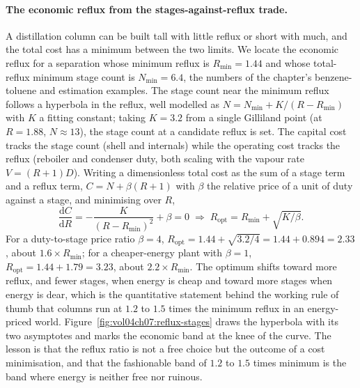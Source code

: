 \paragraph{The economic reflux from the stages-against-reflux trade.} A
distillation column can be built tall with little reflux or short with much,
and the total cost has a minimum between the two limits. We locate the
economic reflux for a separation whose minimum reflux is $R_{\min} = 1.44$
and whose total-reflux minimum stage count is $N_{\min} = 6.4$, the numbers of
the chapter's benzene-toluene and estimation examples. The stage count near
the minimum reflux follows a hyperbola in the reflux, well modelled as
$N = N_{\min} + K/(R - R_{\min})$ with $K$ a fitting constant; taking $K =
3.2$ from a single Gilliland point (at $R = 1.88$, $N \approx 13$), the stage
count at a candidate reflux is set. The capital cost tracks the stage count
(shell and internals) while the operating cost tracks the reflux (reboiler
and condenser duty, both scaling with the vapour rate $V = (R+1)D$). Writing
a dimensionless total cost as the sum of a stage term and a reflux term,
$C = N + \beta(R+1)$ with $\beta$ the relative price of a unit of duty
against a stage, and minimising over $R$,
\[
\frac{\mathrm{d}C}{\mathrm{d}R} = -\frac{K}{(R - R_{\min})^2} + \beta = 0
\;\Rightarrow\; R_{\text{opt}} = R_{\min} + \sqrt{K/\beta}.
\]
For a duty-to-stage price ratio $\beta = 4$, $R_{\text{opt}} = 1.44 +
\sqrt{3.2/4} = 1.44 + 0.894 = 2.33$, about $1.6\times R_{\min}$; for a
cheaper-energy plant with $\beta = 1$, $R_{\text{opt}} = 1.44 + 1.79 = 3.23$,
about $2.2\times R_{\min}$. The optimum shifts toward more reflux, and fewer
stages, when energy is cheap and toward more stages when energy is dear,
which is the quantitative statement behind the working rule of thumb that
columns run at $1.2$ to $1.5$ times the minimum reflux in an energy-priced
world. Figure~\ref{fig:vol04ch07:reflux-stages} draws the hyperbola with its
two asymptotes and marks the economic band at the knee of the curve. The
lesson is that the reflux ratio is not a free choice but the outcome of a cost
minimisation, and that the fashionable band of $1.2$ to $1.5$ times minimum is
the band where energy is neither free nor ruinous.



